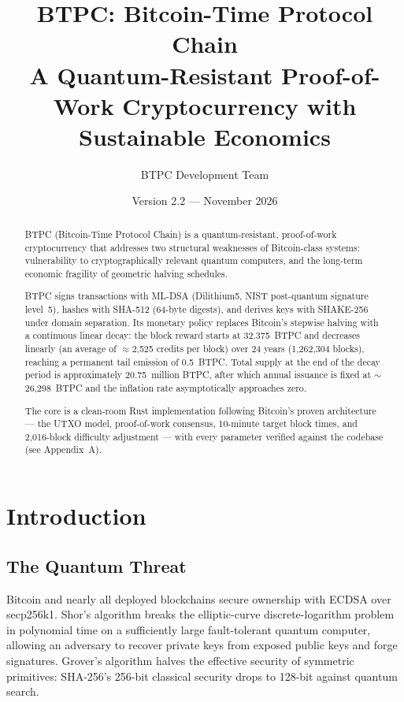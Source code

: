 \documentclass[11pt,a4paper]{article}
\title{\textbf{BTPC: Bitcoin-Time Protocol Chain}\\[0.6em]
\large A Quantum-Resistant Proof-of-Work Cryptocurrency with Sustainable Economics}
\author{BTPC Development Team}
\date{Version 2.2 --- November 2026}
\begin{document}
\maketitle

\begin{abstract}
\noindent BTPC (Bitcoin-Time Protocol Chain) is a quantum-resistant, proof-of-work cryptocurrency that addresses two structural weaknesses of Bitcoin-class systems: vulnerability to cryptographically relevant quantum computers, and the long-term economic fragility of geometric halving schedules.

BTPC signs transactions with ML-DSA (Dilithium5, NIST post-quantum signature level~5), hashes with SHA-512 (64-byte digests), and derives keys with SHAKE-256 under domain separation. Its monetary policy replaces Bitcoin's stepwise halving with a continuous linear decay: the block reward starts at 32.375~BTPC and decreases linearly (an average of $\approx$2{,}525 credits per block) over 24 years (1{,}262{,}304 blocks), reaching a permanent tail emission of 0.5~BTPC. Total supply at the end of the decay period is approximately 20.75~million BTPC, after which annual issuance is fixed at $\sim$26{,}298~BTPC and the inflation rate asymptotically approaches zero.

The core is a clean-room Rust implementation following Bitcoin's proven architecture --- the UTXO model, proof-of-work consensus, 10-minute target block times, and 2{,}016-block difficulty adjustment --- with every parameter verified against the codebase (see Appendix~A).
\end{abstract}

\tableofcontents
\newpage

\section{Introduction}

\subsection{The Quantum Threat}

Bitcoin and nearly all deployed blockchains secure ownership with ECDSA over secp256k1. Shor's algorithm breaks the elliptic-curve discrete-logarithm problem in polynomial time on a sufficiently large fault-tolerant quantum computer, allowing an adversary to recover private keys from exposed public keys and forge signatures. Grover's algorithm halves the effective security of symmetric primitives: SHA-256's 256-bit classical security drops to 128-bit against quantum search.
\end{document}
